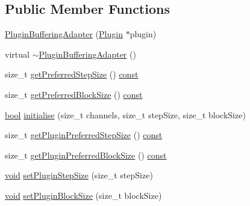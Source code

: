 \subsection*{Public Member Functions}
\begin{DoxyCompactItemize}
\item 
\hyperlink{class_vamp_1_1_host_ext_1_1_plugin_buffering_adapter_a1276bcfcbe1414b33eeefbd7b2b702fe}{Plugin\+Buffering\+Adapter} (\hyperlink{class_vamp_1_1_plugin}{Plugin} $\ast$plugin)
\item 
virtual \hyperlink{class_vamp_1_1_host_ext_1_1_plugin_buffering_adapter_a539423b54a4ede511476125f4a97d977}{$\sim$\+Plugin\+Buffering\+Adapter} ()
\item 
size\+\_\+t \hyperlink{class_vamp_1_1_host_ext_1_1_plugin_buffering_adapter_a2e66d009df69c951001e5d2786973d60}{get\+Preferred\+Step\+Size} () \hyperlink{getopt1_8c_a2c212835823e3c54a8ab6d95c652660e}{const} 
\item 
size\+\_\+t \hyperlink{class_vamp_1_1_host_ext_1_1_plugin_buffering_adapter_a21e45180b19873f9ab69fe7a4e184a03}{get\+Preferred\+Block\+Size} () \hyperlink{getopt1_8c_a2c212835823e3c54a8ab6d95c652660e}{const} 
\item 
\hyperlink{mac_2config_2i386_2lib-src_2libsoxr_2soxr-config_8h_abb452686968e48b67397da5f97445f5b}{bool} \hyperlink{class_vamp_1_1_host_ext_1_1_plugin_buffering_adapter_a9e7798ba4d7870db46502ab541ab37a8}{initialise} (size\+\_\+t channels, size\+\_\+t step\+Size, size\+\_\+t block\+Size)
\item 
size\+\_\+t \hyperlink{class_vamp_1_1_host_ext_1_1_plugin_buffering_adapter_ad7fad500331808b5cdf90f5a45019b02}{get\+Plugin\+Preferred\+Step\+Size} () \hyperlink{getopt1_8c_a2c212835823e3c54a8ab6d95c652660e}{const} 
\item 
size\+\_\+t \hyperlink{class_vamp_1_1_host_ext_1_1_plugin_buffering_adapter_a7045be875de9dd226d2e2a222e957de0}{get\+Plugin\+Preferred\+Block\+Size} () \hyperlink{getopt1_8c_a2c212835823e3c54a8ab6d95c652660e}{const} 
\item 
\hyperlink{sound_8c_ae35f5844602719cf66324f4de2a658b3}{void} \hyperlink{class_vamp_1_1_host_ext_1_1_plugin_buffering_adapter_ac99898d78a01a7fad4def4d6c5fd3a7e}{set\+Plugin\+Step\+Size} (size\+\_\+t step\+Size)
\item 
\hyperlink{sound_8c_ae35f5844602719cf66324f4de2a658b3}{void} \hyperlink{class_vamp_1_1_host_ext_1_1_plugin_buffering_adapter_aa80ae1bff6f95e805811df2c3770a98c}{set\+Plugin\+Block\+Size} (size\+\_\+t block\+Size)
\item 

\end{DoxyCompactItemize}
